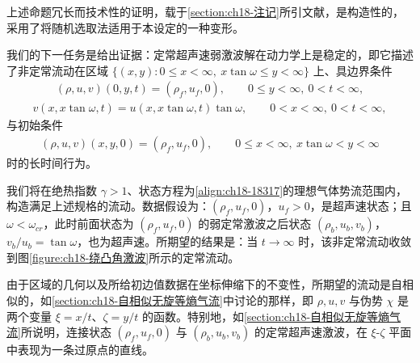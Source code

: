 \documentclass[../../main.tex]{subfiles}
\begin{document}
上述命题冗长而技术性的证明，载于\cref{section:ch18-注记}所引文献，是构造性的，采用了将随机选取法适用于本设定的一种变形。

我们的下一任务是给出证据：定常超声速弱激波解在动力学上是稳定的，即它描述了非定常流动在区域 $\{(x,y):0\leqslant x<\infty,\ x\tan\omega\leqslant y<\infty\}$ 上、具边界条件
\begin{align}
(\rho,u,v)(0,y,t)=(\rho_f,u_f,0),\qquad 0\leqslant y<\infty,\ 0<t<\infty,
\label{align:ch18-1846}
\end{align}
\begin{align}
v(x,x\tan\omega,t)=u(x,x\tan\omega,t)\tan\omega,\qquad 0<x<\infty,\ 0<t<\infty,
\label{align:ch18-1847}
\end{align}
与初始条件
\begin{align}
(\rho,u,v)(x,y,0)=(\rho_f,u_f,0),\qquad 0\leqslant x<\infty,\ x\tan\omega<y<\infty
\label{align:ch18-1848}
\end{align}
时的长时间行为。

我们将在绝热指数 $\gamma>1$、状态方程为\eqref{align:ch18-18317}的理想气体势流范围内，构造满足上述规格的流动。数据假设为：$(\rho_f,u_f,0)$，$u_f>0$，是超声速状态；且 $\omega<\omega_{cr}$，此时前面状态为 $(\rho_f,u_f,0)$ 的弱定常激波之后状态 $(\rho_b,u_b,v_b)$，$v_b/u_b=\tan\omega$，也为超声速。所期望的结果是：当 $t\to\infty$ 时，该非定常流动收敛到图\cref{figure:ch18-绕凸角激波}所示的定常流动。

由于区域的几何以及所给初边值数据在坐标伸缩下的不变性，所期望的流动是自相似的，如\cref{section:ch18-自相似无旋等熵气流}中讨论的那样，即 $\rho,u,v$ 与伪势 $\chi$ 是两个变量 $\xi=x/t$、$\zeta=y/t$ 的函数。特别地，如\cref{section:ch18-自相似无旋等熵气流}所说明，连接状态 $(\rho_f,u_f,0)$ 与 $(\rho_b,u_b,v_b)$ 的定常超声速激波，在 $\xi$-$\zeta$ 平面中表现为一条过原点的直线。
\end{document}
